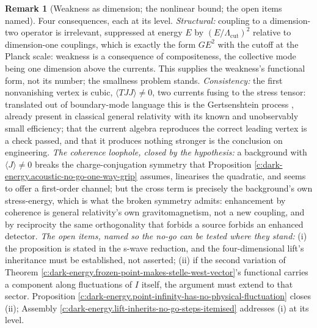 \documentclass[11pt]{article}
\theoremstyle{definition}
\newtheorem{remark}[theorem]{Remark}
\theoremstyle{plain}
\begin{document}
\begin{remark}[Weakness as dimension; the nonlinear bound; the open items named]\label{c:note.dark-energy.weakness-dimension-nonlinear-bound-open-items}
Four consequences, each at its level. \emph{Structural:} coupling to a dimension-two operator is irrelevant, suppressed at energy $E$ by $(E/\Lambda_{\mathrm{cut}})^2$ relative to dimension-one couplings, which is exactly the form $GE^2$ with the cutoff at the Planck scale: weakness is a consequence of compositeness, the collective mode being one dimension above the currents. This supplies the weakness's functional form, not its number; the smallness problem stands. \emph{Consistency:} the first nonvanishing vertex is cubic, $\langle TJJ\rangle \neq 0$, two currents fusing to the stress tensor: translated out of boundary-mode language this is the Gertsenshtein process \cite{Gertsenshtein1962}, already present in classical general relativity with its known and unobservably small efficiency; that the current algebra reproduces the correct leading vertex is a check passed, and that it produces nothing stronger is the conclusion on engineering. \emph{The coherence loophole, closed by the hypothesis:} a background with $\langle J\rangle \neq 0$ breaks the charge-conjugation symmetry that Proposition \ref{c:dark-energy.acoustic-no-go-one-way-grip} assumes, linearises the quadratic, and seems to offer a first-order channel; but the cross term is precisely the background's own stress-energy, which is what the broken symmetry admits: enhancement by coherence is general relativity's own gravitomagnetism, not a new coupling, and by reciprocity the same orthogonality that forbids a source forbids an enhanced detector. \emph{The open items, named so the no-go can be tested where they stand:} (i) the proposition is stated in the s-wave reduction, and the four-dimensional lift's inheritance must be established, not asserted; (ii) if the second variation of Theorem \ref{c:dark-energy.frozen-point-makes-stelle-west-vector}'s functional carries a component along fluctuations of $I$ itself, the argument must extend to that sector. Proposition \ref{c:dark-energy.point-infinity-has-no-physical-fluctuation} closes (ii); Assembly \ref{c:dark-energy.lift-inherits-no-go-steps-itemised} addresses (i) at its level.
\end{remark}
\end{document}
